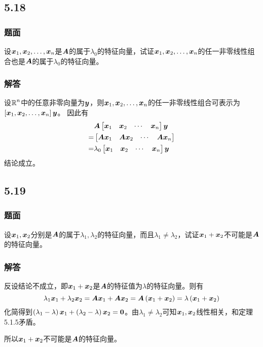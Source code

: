 \documentclass[9pt,xcolor=svgnames]{beamer} %
\begin{document}
\subsection*{5.18}
\begin{frame}
    \frametitle{题面}
    设\({\boldsymbol{x}}_1,{\boldsymbol{x}}_2,\dots,{\boldsymbol{x}}_{n}\)是\(\boldsymbol{A}\)的属于\(\lambda_0\)的特征向量，试证\({\boldsymbol{x}}_1,{\boldsymbol{x}}_2,\dots,{\boldsymbol{x}}_{n}\)的任一非零线性组合也是\(\boldsymbol{A}\)的属于\(\lambda_0\)的特征向量。
\end{frame}

\begin{frame}
    \frametitle{解答}
    设\(\boldsymbol{\mathbb{R}}^n\)中的任意非零向量为\(\boldsymbol{y}\)，则\({\boldsymbol{x}}_1,{\boldsymbol{x}}_2,\dots,{\boldsymbol{x}}_{n}\)的任一非零线性组合可表示为\(\left[ {\boldsymbol{x}}_1,{\boldsymbol{x}}_2,\dots,{\boldsymbol{x}}_{n} \right]\boldsymbol{y}\)。
    \pause
    因此有
    \begin{align*}
          & \boldsymbol{A}\begin{bmatrix}\boldsymbol{x}_1&\boldsymbol{x}_2&\cdots&\boldsymbol{x}_n\end{bmatrix}\boldsymbol{y}      \\
        = & \begin{bmatrix}\boldsymbol{A}\boldsymbol{x}_1&\boldsymbol{A}\boldsymbol{x}_2&\cdots&\boldsymbol{A}\boldsymbol{x}_n\end{bmatrix} \\
        = & \lambda_0\begin{bmatrix}\boldsymbol{x}_1&\boldsymbol{x}_2&\cdots&\boldsymbol{x}_n\end{bmatrix}\boldsymbol{y}
    \end{align*}
    结论成立。
\end{frame}

\subsection*{5.19}
\begin{frame}
    \frametitle{题面}
    设\(\boldsymbol{x}_1,\boldsymbol{x}_2\)分别是\(\boldsymbol{A}\)的属于\(\lambda_1,\lambda_2\)的特征向量，而且\(\lambda_1\neq\lambda_2\)，试证\(\boldsymbol{x}_1+\boldsymbol{x}_2\)不可能是\(\boldsymbol{A}\)的特征向量。
\end{frame}

\begin{frame}
    \frametitle{解答}
    反设结论不成立，即\(\boldsymbol{x}_1+\boldsymbol{x}_2\)是\(\boldsymbol{A}\)的特征值为\(\lambda\)的特征向量。则有
    \begin{equation*}
        \lambda_1\boldsymbol{x}_1+\lambda_2\boldsymbol{x}_2=\boldsymbol{A}\boldsymbol{x}_1+\boldsymbol{A}\boldsymbol{x}_2=\boldsymbol{A}\left( \boldsymbol{x}_1+\boldsymbol{x}_2 \right)=\lambda\left( \boldsymbol{x}_1+\boldsymbol{x}_2 \right)
    \end{equation*}
    \pause
    化简得到\(\left( \lambda_1-\lambda \right)\boldsymbol{x}_1+\left( \lambda_2-\lambda \right)\boldsymbol{x}_2=\boldsymbol{0}\)。由\(\lambda_1\neq\lambda_2\)可知\(\boldsymbol{x}_1,\boldsymbol{x}_2\)线性相关，和定理5.1.5矛盾。

    所以\(\boldsymbol{x}_1+\boldsymbol{x}_2\)不可能是\(\boldsymbol{A}\)的特征向量。
\end{frame}
\end{document}
